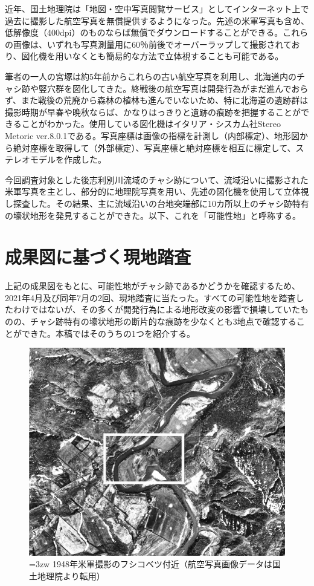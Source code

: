 \documentclass[a4j,11pt,twocolumn,openany]{jsbook}
\begin{document}
近年、国土地理院は「地図・空中写真閲覧サービス」としてインターネット上で過去に撮影した航空写真を無償提供するようになった。先述の米軍写真も含め、低解像度（400dpi）のものならば無償でダウンロードすることができる。これらの画像は、いずれも写真測量用に60％前後でオーバーラップして撮影されており、図化機を用いなくとも簡易的な方法で立体視することも可能である。

筆者の一人の宮塚は約5年前からこれらの古い航空写真を利用し、北海道内のチャシ跡や竪穴群を図化してきた。終戦後の航空写真は開発行為がまだ進んでおらず、また戦後の荒廃から森林の植林も進んでいないため、特に北海道の遺跡群は撮影時期が早春や晩秋ならば、かなりはっきりと遺跡の痕跡を把握することができることがわかった。使用している図化機はイタリア・シスカム社Stereo Metoric ver.8.0.1である。写真座標は画像の指標を計測し（内部標定）、地形図から絶対座標を取得して（外部標定）、写真座標と絶対座標を相互に標定して、ステレオモデルを作成した。

今回調査対象とした後志利別川流域のチャシ跡について、流域沿いに撮影された米軍写真を主とし、部分的に地理院写真を用い、先述の図化機を使用して立体視し探査した。その結果、主に流域沿いの台地突端部に10カ所以上のチャシ跡特有の壕状地形を発見することができた。以下、これを「可能性地」と呼称する。

\section{成果図に基づく現地踏査}
上記の成果図をもとに、可能性地がチャシ跡であるかどうかを確認するため、2021年4月及び同年7月の2回、現地踏査に当たった。すべての可能性地を踏査したわけではないが、その多くが開発行為による地形改変の影響で損壊していたものの、チャシ跡特有の壕状地形の断片的な痕跡を少なくとも3地点で確認することができた。本稿ではそのうちの1つを紹介する。

\begin{figure}[ht]
	\centering
	\includegraphics[width=\linewidth]{fig/05_Miyamoto/pic01.pdf}
	\caption{\hangindent=3zw
		1948年米軍撮影のフシコベツ付近（航空写真画像データは国土地理院より転用）}
	\label{miya01pic}
\end{figure}
\end{document}
